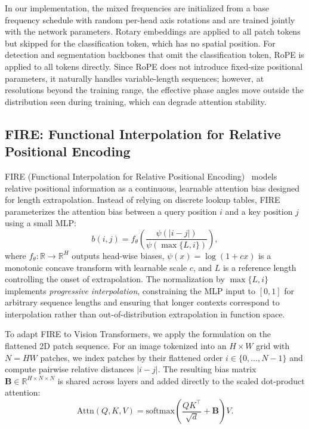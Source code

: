 In our implementation, the mixed frequencies are initialized from a base frequency schedule with random per-head axis rotations and are trained jointly with the network parameters. Rotary embeddings are applied to all patch tokens but skipped for the classification token, which has no spatial position. For detection and segmentation backbones that omit the classification token, RoPE is applied to all tokens directly. Since RoPE does not introduce fixed-size positional parameters, it naturally handles variable-length sequences; however, at resolutions beyond the training range, the effective phase angles move outside the distribution seen during training, which can degrade attention stability.

\subsection{FIRE: Functional Interpolation for Relative Positional Encoding}

FIRE (Functional Interpolation for Relative Positional Encoding)~\cite{li2024functional} models relative positional information as a continuous, learnable attention bias designed for length extrapolation. Instead of relying on discrete lookup tables, FIRE parameterizes the attention bias between a query position $i$ and a key position $j$ using a small MLP:
\begin{equation}
b(i,j) = f_{\theta}\!\left( \frac{\psi(|i-j|)}{\psi(\max\{L,i\})} \right),
\end{equation}
where $f_{\theta}:\mathbb{R}\rightarrow\mathbb{R}^H$ outputs head-wise biases, $\psi(x)=\log(1+cx)$ is a monotonic concave transform with learnable scale $c$, and $L$ is a reference length controlling the onset of extrapolation. The normalization by $\max\{L,i\}$ implements \emph{progressive interpolation}, constraining the MLP input to $[0,1]$ for arbitrary sequence lengths and ensuring that longer contexts correspond to interpolation rather than out-of-distribution extrapolation in function space.

To adapt FIRE to Vision Transformers, we apply the formulation on the flattened 2D patch sequence. For an image tokenized into an $H\times W$ grid with $N=HW$ patches, we index patches by their flattened order $i\in\{0,\ldots,N-1\}$ and compute pairwise relative distances $|i-j|$. The resulting bias matrix $\mathbf{B}\in\mathbb{R}^{H\times N\times N}$ is shared across layers and added directly to the scaled dot-product attention:
\begin{equation}
\text{Attn}(Q,K,V) = \text{softmax}\!\left(\frac{QK^{\top}}{\sqrt{d}} + \mathbf{B}\right)V .
\end{equation}

